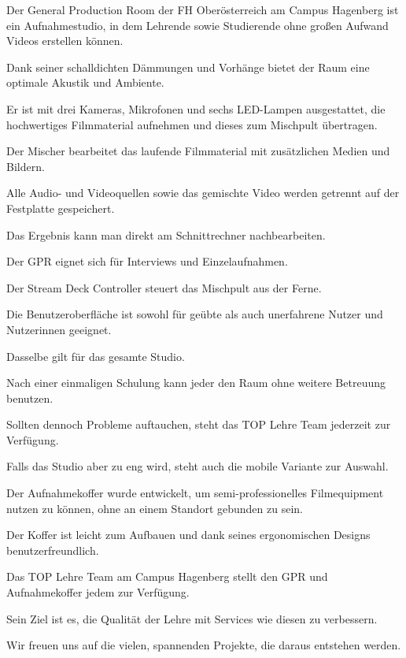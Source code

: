 \documentclass{screenplay}
\begin{document}
	Der General Production Room der FH Oberösterreich am Campus Hagenberg ist ein Aufnahmestudio, in dem Lehrende sowie Studierende ohne großen Aufwand Videos erstellen können.
	
	Dank seiner schalldichten Dämmungen und Vorhänge bietet der Raum eine optimale Akustik und Ambiente.
		
	Er ist mit drei Kameras, Mikrofonen und sechs LED-Lampen ausgestattet, die hochwertiges Filmmaterial aufnehmen und dieses zum Mischpult übertragen.
	
	Der Mischer bearbeitet das laufende Filmmaterial mit zusätzlichen Medien und Bildern.
	
	Alle Audio- und Videoquellen sowie das gemischte Video werden getrennt auf der Festplatte gespeichert.
	
	Das Ergebnis kann man direkt am Schnittrechner nachbearbeiten.
	
	Der GPR eignet sich für Interviews und Einzelaufnahmen.
	
	Der Stream Deck Controller steuert das Mischpult aus der Ferne.
	
	Die Benutzeroberfläche ist sowohl für geübte als auch unerfahrene Nutzer und Nutzerinnen geeignet.
		
	Dasselbe gilt für das gesamte Studio.
	
	Nach einer einmaligen Schulung kann jeder den Raum ohne weitere Betreuung benutzen.
	
	Sollten dennoch Probleme auftauchen, steht das TOP Lehre Team jederzeit zur Verfügung.
	
	Falls das Studio aber zu eng wird, steht auch die mobile Variante zur Auswahl.
		
	Der Aufnahmekoffer wurde entwickelt, um semi-professionelles Filmequipment nutzen zu können, ohne an einem Standort gebunden zu sein.
		
	Der Koffer ist leicht zum Aufbauen und dank seines ergonomischen Designs benutzerfreundlich.
		
	Das TOP Lehre Team am Campus Hagenberg stellt den GPR und Aufnahmekoffer jedem zur Verfügung.
	
	Sein Ziel ist es, die Qualität der Lehre mit Services wie diesen zu verbessern.
	
	Wir freuen uns auf die vielen, spannenden Projekte, die daraus entstehen werden.
\end{document}
